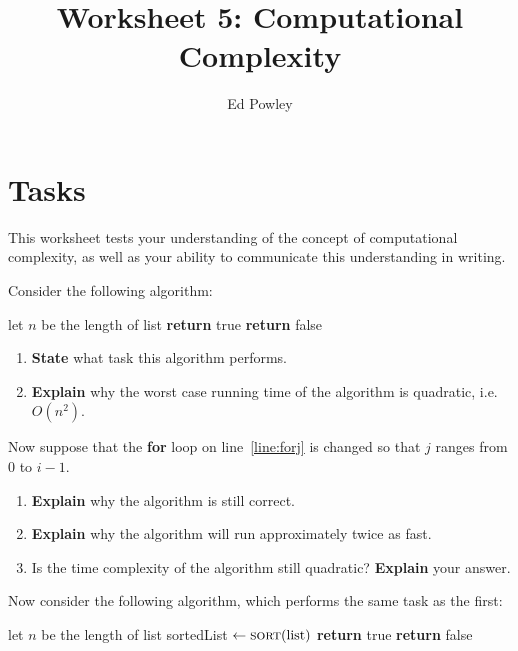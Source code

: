 \documentclass{../../../fal_assignment}
\title{Worksheet 5: Computational Complexity}
\author{Ed Powley}
\begin{document}
\maketitle
{}

\section*{Tasks}

This worksheet tests your understanding of the concept of computational complexity,
as well as your ability to communicate this understanding in writing.

Consider the following algorithm:

\begin{algorithmic}[1]
		\State let $n$ be the length of list
			 \label{line:forj}
					\State \textbf{return} true
				\EndIf
			\EndFor
		\EndFor
		\State \textbf{return} false
	\EndProcedure
\end{algorithmic}

\begin{enumerate}[label=(\alph*)]
	\item\label{q:first} \textbf{State} what task this algorithm performs.
	\item \textbf{Explain} why the worst case running time of the algorithm is quadratic, i.e.\ $O(n^2)$.
\end{enumerate}

Now suppose that the \textbf{for} loop on line~\ref{line:forj} is changed so that $j$ ranges from $0$ to $i-1$.

\begin{enumerate}[resume,label=(\alph*)]
	\item \textbf{Explain} why the algorithm is still correct.
	\item \textbf{Explain} why the algorithm will run approximately twice as fast.
	\item Is the time complexity of the algorithm still quadratic? \textbf{Explain} your answer.
\end{enumerate}

Now consider the following algorithm, which performs the same task as the first:

\begin{algorithmic}[1]
		\State let $n$ be the length of list
		\State sortedList $\gets \Call{sort}{\text{list}}$
				\State \textbf{return} true
			\EndIf
		\EndFor
		\State \textbf{return} false
	\EndProcedure
\end{algorithmic}
\end{document}
